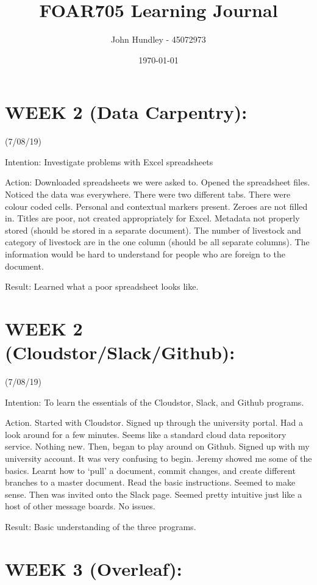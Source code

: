 \documentclass[a4paper,12pt]{article}
\title{FOAR705 Learning Journal}
\author{John Hundley - 45072973}
\date{\today}
\begin{document}
\maketitle

\section{WEEK 2 (Data Carpentry):}

(7/08/19)

Intention: Investigate problems with Excel spreadsheets

Action: Downloaded spreadsheets we were asked to. Opened the spreadsheet files. Noticed the data was everywhere. There were two different tabs. There were colour coded cells. Personal and contextual markers present. Zeroes are not filled in. Titles are poor, not created appropriately for Excel. Metadata not properly stored (should be stored in a separate document). The number of livestock and category of livestock are in the one column (should be all separate columns). The information would be hard to understand for people who are foreign to the document. 

Result: Learned what a poor spreadsheet looks like. 

\section{WEEK 2 (Cloudstor/Slack/Github):}

(7/08/19)

Intention: To learn the essentials of the Cloudstor, Slack, and Github programs. 

Action. Started with Cloudstor. Signed up through the university portal. Had a look around for a few minutes. Seems like a standard cloud data repository service. Nothing new. Then, began to play around on Github. Signed up with my university account. It was very confusing to begin. Jeremy showed me some of the basics. Learnt how to ‘pull’ a document, commit changes, and create different branches to a master document. Read the basic instructions. Seemed to make sense. Then was invited onto the Slack page. Seemed pretty intuitive just like a host of other message boards. No issues.

Result: Basic understanding of the three programs. 

\section{WEEK 3 (Overleaf):}
\end{document}
